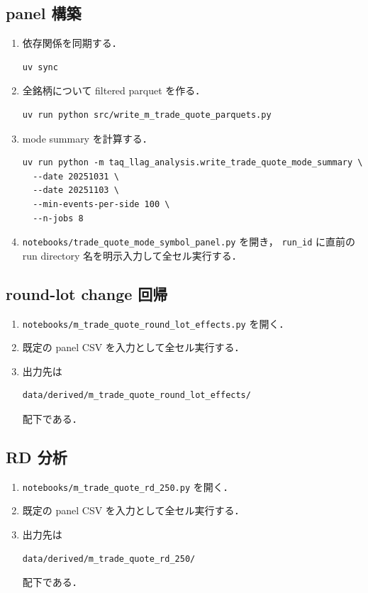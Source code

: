 \documentclass[a4paper,11pt]{jlreq}
\begin{document}
\subsection{panel 構築}

\begin{enumerate}
  \item 依存関係を同期する．
\begin{verbatim}
uv sync
\end{verbatim}

  \item 全銘柄について filtered parquet を作る．
\begin{verbatim}
uv run python src/write_m_trade_quote_parquets.py
\end{verbatim}

  \item mode summary を計算する．
\begin{verbatim}
uv run python -m taq_llag_analysis.write_trade_quote_mode_summary \
  --date 20251031 \
  --date 20251103 \
  --min-events-per-side 100 \
  --n-jobs 8
\end{verbatim}

  \item \texttt{notebooks/trade\_quote\_mode\_symbol\_panel.py} を開き，
        \texttt{run\_id} に直前の run directory 名を明示入力して全セル実行する．
\end{enumerate}

\subsection{round-lot change 回帰}

\begin{enumerate}
  \item \texttt{notebooks/m\_trade\_quote\_round\_lot\_effects.py} を開く．
  \item 既定の panel CSV を入力として全セル実行する．
  \item 出力先は
\begin{verbatim}
data/derived/m_trade_quote_round_lot_effects/
\end{verbatim}
        配下である．
\end{enumerate}

\subsection{RD 分析}

\begin{enumerate}
  \item \texttt{notebooks/m\_trade\_quote\_rd\_250.py} を開く．
  \item 既定の panel CSV を入力として全セル実行する．
  \item 出力先は
\begin{verbatim}
data/derived/m_trade_quote_rd_250/
\end{verbatim}
        配下である．
\end{enumerate}
\end{document}
